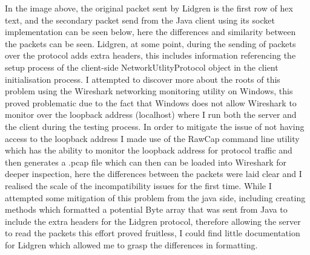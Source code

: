 \documentclass{article}
\begin{document}
In the image above, the original packet sent by Lidgren is the first row of hex text, and the secondary packet send from the Java client using its socket implementation can be seen below, here the differences and similarity between the packets can be seen. Lidgren, at some point, during the sending of packets over the protocol adds extra headers, this includes information referencing the setup process of the client-side NetworkUtlityProtocol object in the client initialisation process. I attempted to discover more about the roots of this problem using the Wireshark networking monitoring utility on Windows, this proved problematic due to the fact that Windows does not allow Wireshark to monitor over the loopback address (localhost) where I run both the server and the client during the testing process. In order to mitigate the issue of not having access to the loopback address I made use of the RawCap command line utility which has the ability to monitor the loopback address for protocol traffic and then generates a .pcap file which can then can be loaded into Wireshark for deeper inspection, here the differences between the packets were laid clear and I realised the scale of the incompatibility issues for the first time. While I attempted some mitigation of this problem from the java side, including creating methods which formatted a potential Byte array that was sent from Java to include the extra headers for the Lidgren protocol, therefore allowing the server to read the packets this effort proved fruitless, I could find little documentation for Lidgren which allowed me to grasp the differences in formatting.
\end{document}
